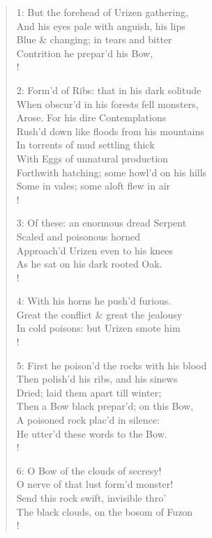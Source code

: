 \documentclass[9pt]{extarticle}
\begin{document}
\begin{verse}
\begin{altverse} 
		
		1: But the forehead of Urizen gathering,\\
		And his eyes pale with anguish, his lips\\
		Blue \& changing; in tears and bitter\\
		Contrition he prepar’d his Bow,\\!
		
		2: Form’d of Ribs: that in his dark solitude\\
		When obscur’d in his forests fell monsters,\\
		Arose. For his dire Contemplations\\
		Rush’d down like floods from his mountains\\
		In torrents of mud settling thick\\
		With Eggs of unnatural production\\
		Forthwith hatching; some howl’d on his hills\\
		Some in vales; some aloft flew in air\\!
		
		3: Of these: an enormous dread Serpent\\
		Scaled and poisonous horned\\
		Approach’d Urizen even to his knees\\
		As he sat on his dark rooted Oak.\\!
		
		4: With his horns he push’d furious.\\
		Great the conflict \& great the jealousy\\
		In cold poisons: but Urizen smote him\\!
		
		5: First he poison’d the rocks with his blood\\
		Then polish’d his ribs, and his sinews\\
		Dried; laid them apart till winter;\\
		Then a Bow black prepar’d; on this Bow,\\
		A poisoned rock plac’d in silence:\\
		He utter’d these words to the Bow.\\!
		
		6: O Bow of the clouds of secresy!\\
		O nerve of that lust form’d monster!\\
		Send this rock swift, invisible thro’\\
		The black clouds, on the bosom of Fuzon\\!
		

\end{altverse}
\end{verse}
\end{document}
